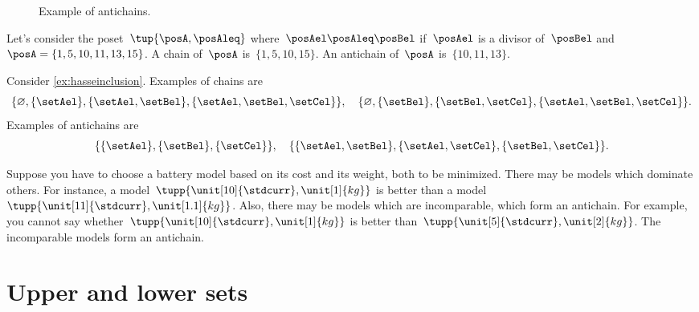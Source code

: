 \begin{figure}[h!]
  \begin{center}
  \end{center}
  \caption{Example of antichains. }
  \label{fig:antichain}
\end{figure}


\begin{example}
  Let's consider the poset~$\tup{\posA,\posAleq}$ where~$\posAel \posAleq \posBel$ if~$\posAel$ is a divisor of~$\posBel$ and~$\posA=\{1,5,10,11,13,15\}$.
  A chain of~$\posA$ is~$\{1,5,10,15\}$. An antichain of~$\posA$ is~$\{10,11,13\}$.
\end{example}

\begin{example}
  Consider \cref{ex:hasseinclusion}. Examples of chains are
  \begin{equation}
    \{\varnothing,\{\setAel\},\{\setAel,\setBel\},\{\setAel,\setBel,\setCel\}\}, \quad  \{\varnothing,\{\setBel\},\{\setBel,\setCel\},\{\setAel,\setBel,\setCel\}\}.
  \end{equation}
  Examples of antichains are
  \begin{equation}
    \{\{\setAel\},\{\setBel\},\{\setCel\}\}, \quad \{ \{\setAel,\setBel\},\{\setAel,\setCel\}, \{\setBel,\setCel\}\}.
  \end{equation}
\end{example}

\begin{example}
  \label{ex:battery}
  Suppose you have to choose a battery model based on its cost and its weight, both to be minimized.
  There may be models which dominate others.
  For instance, a model~$\tupp{\unit[10]{\stdcurr},\unit[1]{kg}}$ is better than a model~$\tupp{\unit[11]{\stdcurr},\unit[1.1]{kg}}$.
  Also, there may be models which are incomparable, which form an antichain.
  For example, you cannot say whether~$\tupp{\unit[10]{\stdcurr},\unit[1]{kg}}$ is better than~$\tupp{\unit[5]{\stdcurr},\unit[2]{kg}}$. The incomparable models form an antichain.
\end{example}


\section{Upper and lower sets}
\label{sec:UpperLowerSets}



